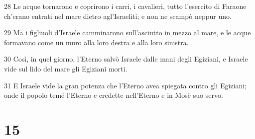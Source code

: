 \par 28 Le acque tornarono e coprirono i carri, i cavalieri, tutto l'esercito di Faraone ch'erano entrati nel mare dietro agl'Israeliti; e non ne scampò neppur uno.
\par 29 Ma i figliuoli d'Israele camminarono sull'asciutto in mezzo al mare, e le acque formavano come un muro alla loro destra e alla loro sinistra.
\par 30 Così, in quel giorno, l'Eterno salvò Israele dalle mani degli Egiziani, e Israele vide sul lido del mare gli Egiziani morti.
\par 31 E Israele vide la gran potenza che l'Eterno avea spiegata contro gli Egiziani; onde il popolo temé l'Eterno e credette nell'Eterno e in Mosè suo servo.

\chapter{15}

